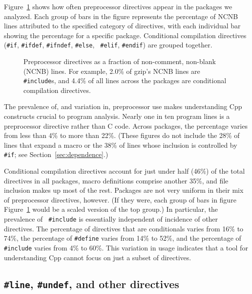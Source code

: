 \documentclass[10pt]{article}
\newcommand{\captionsmall}[1]{\caption[]{\small #1}}
\begin{document}
Figure~\ref{fig:directives-breakdown} shows how often preprocessor
directives appear in the packages we analyzed.  Each group of bars in the
figure represents the percentage of NCNB lines
attributed to the specified category of directives, with each individual
bar showing the percentage for a specific package.  Conditional compilation
directives ({\tt \#if}, {\tt \#ifdef}, {\tt \#ifndef}, {\tt \#else}, {\tt
\#elif}, {\tt \#endif}) are grouped together.

\begin{figure}
\centerline{}
\captionsmall{Preprocessor directives as a fraction of non-comment,
  non-blank (NCNB) lines.  For
  example, 2.0\% of gzip's NCNB lines are {\tt \#include}s, and 4.4\% of all
  lines across the packages are conditional compilation directives.}
\label{fig:directives-breakdown}
\end{figure}

The prevalence of, and variation in, preprocessor use makes understanding
Cpp constructs crucial to program analysis.  Nearly one in ten program
lines is a 
preprocessor directive rather than C code.  Across packages, the percentage
varies from less than 4\% to more than 22\%.  (These figures do not include
the 28\% of lines that expand a macro or the 38\% of lines whose inclusion
is controlled by {\tt \#if}; see Section~\ref{sec:dependence}.)


Conditional compilation directives account for just under half (46\%) of
the total directives in all packages, macro definitions comprise another
35\%, and file inclusion makes up most of the rest.  Packages are not very
uniform in their mix of preprocessor directives, however.  (If they were,
each group of bars in figure Figure~\ref{fig:directives-breakdown} would be
a scaled version of the top group.)  In particular, the prevalence of {\tt
\#include} is essentially independent of incidence of other directives.
The percentage of directives that are conditionals varies from 16\% to
74\%, the percentage of {\tt \#define} varies from 14\% to 52\%, and the
percentage of {\tt \#include} varies from 4\% to 60\%.  This variation in
usage indicates that a tool for understanding Cpp cannot focus on just a
subset of directives.


\subsection{{\tt \#line}, {\tt \#undef}, and other directives}
\end{document}
